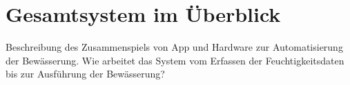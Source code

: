 \chapter{Gesamtsystem im Überblick}
Beschreibung des Zusammenspiels von App und Hardware zur Automatisierung der Bewässerung. Wie arbeitet das System vom Erfassen der Feuchtigkeitsdaten bis zur Ausführung der Bewässerung?